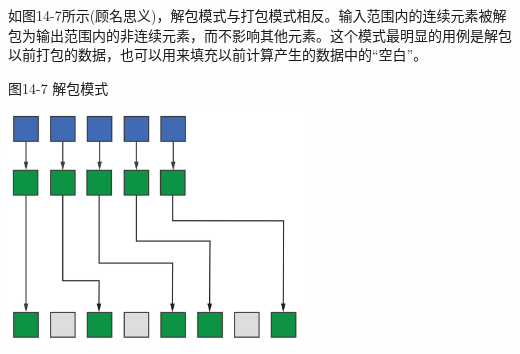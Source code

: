 如图14-7所示(顾名思义)，解包模式与打包模式相反。输入范围内的连续元素被解包为输出范围内的非连续元素，而不影响其他元素。这个模式最明显的用例是解包以前打包的数据，也可以用来填充以前计算产生的数据中的“空白”。\par

\hspace*{\fill} \par %
图14-7 解包模式
\begin{center}
	\includegraphics[width=0.6\textwidth]{content/chapter-14/images/7}
\end{center}


















